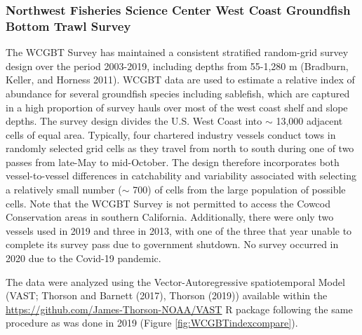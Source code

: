 \documentclass[11pt,
  english,
  a4paper,
]{article}
\begin{document}
\leavevmode\tagmcend\tagstructend


\hypertarget{nwcbo}{%
\subsubsection{Northwest Fisheries Science Center West Coast Groundfish Bottom Trawl Survey}\label{nwcbo}}

\leavevmode\tagmcend\tagstructend


The WCGBT Survey has maintained a consistent stratified random-grid survey design over the period 2003-2019, including depths from 55-1,280 m {(Bradburn, Keller, and Horness 2011)\leavevmode\tagmcend\tagstructend}. WCGBT data are used to estimate a relative index of abundance for several groundfish species including sablefish, which are captured in a high proportion of survey hauls over most of the west coast shelf and slope depths. The survey design divides the U.S. West Coast into {\(\sim\)\leavevmode\tagmcend\tagstructend} 13,000 adjacent cells of equal area. Typically, four chartered industry vessels conduct tows in randomly selected grid cells as they travel from north to south during one of two passes from late-May to mid-October. The design therefore incorporates both vessel-to-vessel differences in catchability and variability associated with selecting a relatively small number ({\(\sim\)\leavevmode\tagmcend\tagstructend} 700) of cells from the large population of possible cells. Note that the WCGBT Survey is not permitted to access the Cowcod Conservation areas in southern California. Additionally, there were only two vessels used in 2019 and three in 2013, with one of the three that year unable to complete its survey pass due to government shutdown. No survey occurred in 2020 due to the Covid-19 pandemic.

\leavevmode\tagmcend\tagstructend\par

The data were analyzed using the Vector-Autoregressive spatiotemporal Model (VAST; {Thorson and Barnett (2017)\leavevmode\tagmcend\tagstructend}, {Thorson (2019)\leavevmode\tagmcend\tagstructend}) available within the {\href{VAST}{https://github.com/James-Thorson-NOAA/VAST}\leavevmode\tagmcend\tagstructend} R package following the same procedure as was done in 2019 (Figure \ref{fig:WCGBTindexcompare}).
\end{document}
